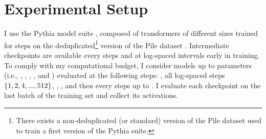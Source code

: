 


\section{Experimental Setup}\label{sec:experimental_setup}

I use the Pythia model suite \citep{biderman2023pythia}, composed of  transformers of different sizes trained for  steps on the deduplicated\footnote{There exists a non-deduplicated (or standard) version of the Pile dataset used to train a first version of the Pythia suite.} version of the Pile dataset \citep{gao2020pile}.
Intermediate checkpoints are available every  steps and at log-spaced intervals early in training.
To comply with my computational budget, I consider models up to  parameters (i.e., \sevenmil, \sixmil, \fourmil, \onebil, and \twobil) evaluated at the following steps: , all log-spaced steps $\{1, 2, 4, ..., 512\}$, , , and then every  steps up to .
I evaluate each checkpoint on the last batch of the training set and collect its activations.

